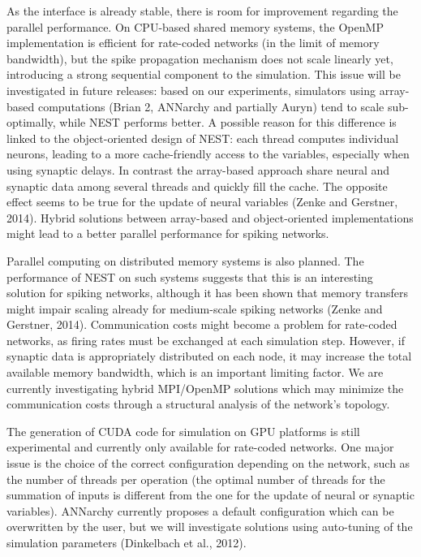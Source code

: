 \documentclass[
  11pt,
  a4paper,
]{scrbook}
\begin{document}
As the interface is already stable, there is room for improvement
regarding the parallel performance. On CPU-based shared memory systems,
the OpenMP implementation is efficient for rate-coded networks (in the
limit of memory bandwidth), but the spike propagation mechanism does not
scale linearly yet, introducing a strong sequential component to the
simulation. This issue will be investigated in future releases: based on
our experiments, simulators using array-based computations (Brian 2,
ANNarchy and partially Auryn) tend to scale sub-optimally, while NEST
performs better. A possible reason for this difference is linked to the
object-oriented design of NEST: each thread computes individual neurons,
leading to a more cache-friendly access to the variables, especially
when using synaptic delays. In contrast the array-based approach share
neural and synaptic data among several threads and quickly fill the
cache. The opposite effect seems to be true for the update of neural
variables (Zenke and Gerstner, 2014). Hybrid solutions between
array-based and object-oriented implementations might lead to a better
parallel performance for spiking networks.

Parallel computing on distributed memory systems is also planned. The
performance of NEST on such systems suggests that this is an interesting
solution for spiking networks, although it has been shown that memory
transfers might impair scaling already for medium-scale spiking networks
(Zenke and Gerstner, 2014). Communication costs might become a problem
for rate-coded networks, as firing rates must be exchanged at each
simulation step. However, if synaptic data is appropriately distributed
on each node, it may increase the total available memory bandwidth,
which is an important limiting factor. We are currently investigating
hybrid MPI/OpenMP solutions which may minimize the communication costs
through a structural analysis of the network's topology.

The generation of CUDA code for simulation on GPU platforms is still
experimental and currently only available for rate-coded networks. One
major issue is the choice of the correct configuration depending on the
network, such as the number of threads per operation (the optimal number
of threads for the summation of inputs is different from the one for the
update of neural or synaptic variables). ANNarchy currently proposes a
default configuration which can be overwritten by the user, but we will
investigate solutions using auto-tuning of the simulation parameters
(Dinkelbach et al., 2012).
\end{document}

